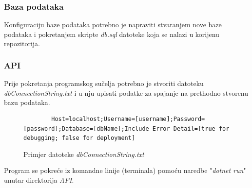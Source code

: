 \documentclass[zavrsnirad]{fer}
\begin{document}
\subsubsection{Baza podataka}
Konfiguraciju baze podataka potrebno je napraviti stvaranjem nove baze podataka i pokretanjem skripte \textit{db.sql} datoteke koja se nalazi u korijenu repozitorija.

\subsubsection{API}
Prije pokretanja programskog sučelja potrebno je stvoriti datoteku \textit{dbConnectionString.txt} i u nju upisati podatke za spajanje na prethodno stvorenu bazu podataka.
\begin{figure}[htb]
	\centering
	\begin{lstlisting}
		Host=localhost;Username=[username];Password=[password];Database=[dbName];Include Error Detail=[true for debugging; false for deployment]
	\end{lstlisting}
	\caption{Primjer datoteke \textit{dbConnectionString.txt}}
\end{figure}
\FloatBarrier

Program se pokreće iz komandne linije (terminala) pomoću naredbe "\textit{dotnet run}" unutar direktorija \textit{API}.
\end{document}
